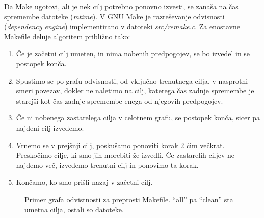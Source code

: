 \documentclass[notitlepage]{report}
\begin{document}
Da Make ugotovi, ali je nek cilj potrebno ponovno izvesti, se zanaša
na čas spremembe datoteke (\textit{mtime}). V GNU Make je razreševanje
odvisnosti (\textit{dependency engine}) implementirano v datoteki
\textit{src/remake.c}. Za enostavne Makefile deluje algoritem
približno tako:

\begin{enumerate}
\item Če je začetni cilj umeten, in nima nobenih predpogojev, se bo
  izvedel in se postopek konča.
\item Spustimo se po grafu odvisnosti, od vključno trenutnega cilja, v
  nasprotni smeri povezav, dokler ne naletimo na cilj, katerega čas
  zadnje spremembe je starejši kot čas zadnje spremembe enega od
  njegovih predpogojev.
\item Če ni nobenega zastarelega cilja v celotnem grafu, se postopek
  konča, sicer pa najdeni cilj izvedemo.
\item Vrnemo se v prejšnji cilj, poskušamo ponoviti korak 2 čim
  večkrat. Preskočimo cilje, ki smo jih morebiti že izvedli. Če
  zastarelih ciljev ne najdemo več, izvedemo trenutni cilj in ponovimo
  ta korak.
\item Končamo, ko smo prišli nazaj v začetni cilj.
\end{enumerate}

\begin{figure}[H]
  \begin{center}
  \caption{Primer grafa odvistnosti za preprosti Makefile. ``all'' pa
    ``clean'' sta umetna cilja, ostali so datoteke.}
\end{center}
\end{figure}
\end{document}
